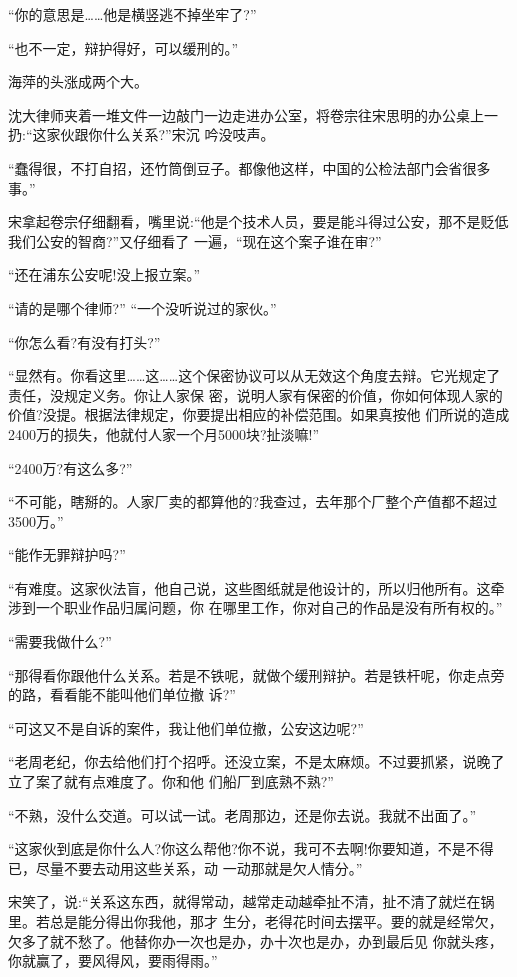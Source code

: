 \documentclass[11pt,a4paper,onecolumn]{article}
\begin{document}
``你的意思是……他是横竖逃不掉坐牢了?''

``也不一定，辩护得好，可以缓刑的。''

海萍的头涨成两个大。

沈大律师夹着一堆文件一边敲门一边走进办公室，将卷宗往宋思明的办公桌上一扔:``这家伙跟你什么关系?''宋沉
吟没吱声。

``蠢得很，不打自招，还竹筒倒豆子。都像他这样，中国的公检法部门会省很多事。''

宋拿起卷宗仔细翻看，嘴里说:``他是个技术人员，要是能斗得过公安，那不是贬低我们公安的智商?''又仔细看了
一遍，``现在这个案子谁在审?''

``还在浦东公安呢!没上报立案。''

``请的是哪个律师?'' ``一个没听说过的家伙。''

``你怎么看?有没有打头?''

``显然有。你看这里……这……这个保密协议可以从无效这个角度去辩。它光规定了责任，没规定义务。你让人家保
密，说明人家有保密的价值，你如何体现人家的价值?没提。根据法律规定，你要提出相应的补偿范围。如果真按他
们所说的造成2400万的损失，他就付人家一个月5000块?扯淡嘛!''

``2400万?有这么多?''

``不可能，瞎掰的。人家厂卖的都算他的?我查过，去年那个厂整个产值都不超过3500万。''

``能作无罪辩护吗?''

``有难度。这家伙法盲，他自己说，这些图纸就是他设计的，所以归他所有。这牵涉到一个职业作品归属问题，你
在哪里工作，你对自己的作品是没有所有权的。''

``需要我做什么?''

``那得看你跟他什么关系。若是不铁呢，就做个缓刑辩护。若是铁杆呢，你走点旁的路，看看能不能叫他们单位撤
诉?''

``可这又不是自诉的案件，我让他们单位撤，公安这边呢?''

``老周老纪，你去给他们打个招呼。还没立案，不是太麻烦。不过要抓紧，说晚了立了案了就有点难度了。你和他
们船厂到底熟不熟?''

``不熟，没什么交道。可以试一试。老周那边，还是你去说。我就不出面了。''

``这家伙到底是你什么人?你这么帮他?你不说，我可不去啊!你要知道，不是不得已，尽量不要去动用这些关系，动
一动那就是欠人情分。''

宋笑了，说:``关系这东西，就得常动，越常走动越牵扯不清，扯不清了就烂在锅里。若总是能分得出你我他，那才
生分，老得花时间去摆平。要的就是经常欠，欠多了就不愁了。他替你办一次也是办，办十次也是办，办到最后见
你就头疼，你就赢了，要风得风，要雨得雨。''
\end{document}
